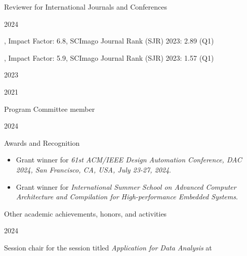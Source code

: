 \documentclass[
	a4paper, %
	10pt, %
]{tresume} %
\begin{document}
%
\begin{tSection}{Reviewer for International Journals and Conferences}
  \begin{tSubsection}{2024}{}{}{}
  \item {}
  \item {}, Impact Factor: 6.8, SCImago Journal Rank (SJR) 2023: 2.89 (Q1)
  \item {}, Impact Factor: 5.9, SCImago Journal Rank (SJR) 2023:
    1.57 (Q1)
  \end{tSubsection}
  \begin{tSubsection}{2023}{}{}{}
  \item {}
  \item {}
  \end{tSubsection}
  \begin{tSubsection}{2021}{}{}{}
  \item {}
  \end{tSubsection}
\end{tSection}
%
\clearpage
\begin{tSection}{Program Committee member}
  \begin{tSubsection}{2024}{}{}{}
    \item {}
\end{tSubsection}
\end{tSection}
%
\begin{tSection}{Awards and Recognition}
  \begin{itemize}
  \item[2024] Grant winner for \emph{61st ACM/IEEE Design Automation
      Conference, DAC 2024, San Francisco, CA, USA, July 23-27,
      2024}.
  \item[2021] Grant winner for \emph{International Summer School on Advanced
      Computer Architecture and Compilation for High-performance Embedded
      Systems}.
  \end{itemize}
\end{tSection}

\begin{tSection}{Other academic achievements, honors, and activities}
  \begin{tSubsection}{2024}{}{}{}
    \item Session chair for the session titled \emph{Application for Data
        Analysis} at~
  \end{tSubsection}

\end{tSection}
\vfill
\ifpublic{%
    \ifgdpr{%
    
    
  }
  \fi
}
\fi
\end{document}
